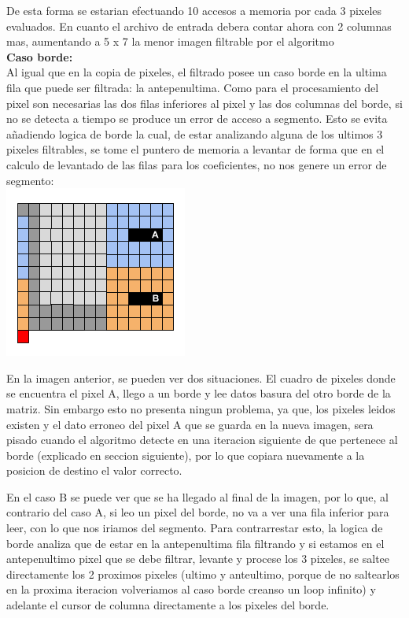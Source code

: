 De esta forma se estarian efectuando 10 accesos a memoria por cada 3 pixeles evaluados. En cuanto el archivo de entrada debera contar ahora con 2 columnas mas, aumentando a 5 x 7 la menor imagen filtrable por el algoritmo
\\
\textbf{Caso borde:}
\\
Al igual que en la copia de pixeles, el filtrado posee un caso borde en la ultima fila que puede ser filtrada: la antepenultima. Como para el procesamiento del pixel son necesarias las dos filas inferiores al pixel y las dos columnas del borde, si no se detecta a tiempo se produce un error de acceso a segmento. Esto se evita añadiendo logica de borde la cual, de estar analizando alguna de los ultimos 3 pixeles filtrables, se tome el puntero de memoria a levantar de forma que en el calculo de levantado de las filas para los coeficientes, no nos genere un error de segmento:\\

\includegraphics[scale=0.7]{imagenes/caso-borde-filtrar.png} 

En la imagen anterior, se pueden ver dos situaciones. El cuadro de pixeles donde se encuentra el pixel A, llego a un borde y lee datos basura del otro borde de la matriz. Sin embargo esto no presenta ningun problema, ya que, los pixeles leidos existen y el dato erroneo del pixel A que se guarda en la nueva imagen, sera pisado cuando el algoritmo detecte en una iteracion siguiente de que pertenece al borde (explicado en seccion siguiente), por lo que copiara nuevamente a la posicion de destino el valor correcto.

En el caso B se puede ver que se ha llegado al final de la imagen, por lo que, al contrario del caso A, si leo un pixel del borde, no va a ver una fila inferior para leer, con lo que nos iriamos del segmento. Para contrarrestar esto, la logica de borde analiza que de estar en la antepenultima fila filtrando y si estamos en el antepenultimo pixel que se debe filtrar, levante y procese los 3 pixeles, se saltee directamente los 2 proximos pixeles (ultimo y anteultimo, porque de no saltearlos en la proxima iteracion volveriamos al caso borde creanso un loop infinito) y adelante el cursor de columna directamente a los pixeles del borde.


